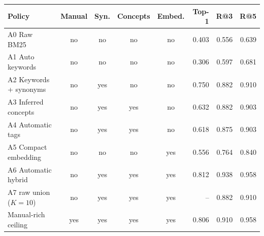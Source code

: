 \begin{tabular}{lccccrrr}
\toprule
Policy & Manual & Syn. & Concepts & Embed. & Top-1 & R@3 & R@5 \\
\midrule
A0 Raw BM25 & no & no & no & no & 0.403 & 0.556 & 0.639 \\
A1 Auto keywords & no & no & no & no & 0.306 & 0.597 & 0.681 \\
A2 Keywords + synonyms & no & yes & no & no & 0.750 & 0.882 & 0.910 \\
A3 Inferred concepts & no & yes & yes & no & 0.632 & 0.882 & 0.903 \\
A4 Automatic tags & no & yes & yes & no & 0.618 & 0.875 & 0.903 \\
A5 Compact embedding & no & no & no & yes & 0.556 & 0.764 & 0.840 \\
A6 Automatic hybrid & no & yes & yes & yes & 0.812 & 0.938 & 0.958 \\
A7 raw union ($K=10$) & no & yes & yes & yes & -- & 0.882 & 0.910 \\
Manual-rich ceiling & yes & yes & yes & yes & 0.806 & 0.910 & 0.958 \\
\bottomrule
\end{tabular}
